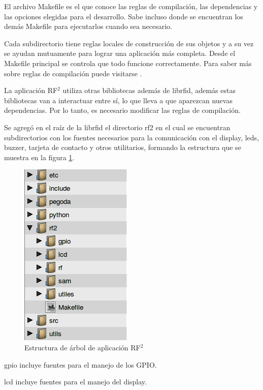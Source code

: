 El archivo Makefile es el que conoce las reglas de compilación, las dependencias y las opciones elegidas para el desarrollo. Sabe incluso donde se encuentran los demás Makefile para ejecutarlos cuando sea necesario.

\bigskip
Cada subdirectorio tiene reglas locales de construcción de sus objetos y a su vez se ayudan mutuamente para lograr una aplicación más completa. Desde el Makefile principal se controla que todo funcione correctamente.
Para saber más sobre reglas de compilación puede visitarse \cite{Make}.

\bigskip
La aplicación RF$^{2}$ utiliza otras bibliotecas además de librfid, además estas bibliotecas van a interactuar entre sí, lo que lleva a que aparezcan nuevas dependencias. Por lo tanto, es necesario modificar las reglas de compilación.

\bigskip
Se agregó en el raíz de la librfid el directorio rf2 en el cual se encuentran subdirectorios con los fuentes necesarios para la comunicación con el display, leds, buzzer, tarjeta de contacto y otros utilitarios, formando la estructura que se muestra en la figura \ref{est_RF2}. 


\begin{figure}[H]
\centering
  \begin{center}
  \includegraphics[scale=.5]{Imagenes/estructura_librfid.png} 
  \end{center}
  \caption{Estructura de árbol de aplicación RF$^{2}$}\label{est_RF2} 
\end{figure}

gpio incluye fuentes para el manejo de los GPIO.

lcd incluye fuentes para el manejo del display.

